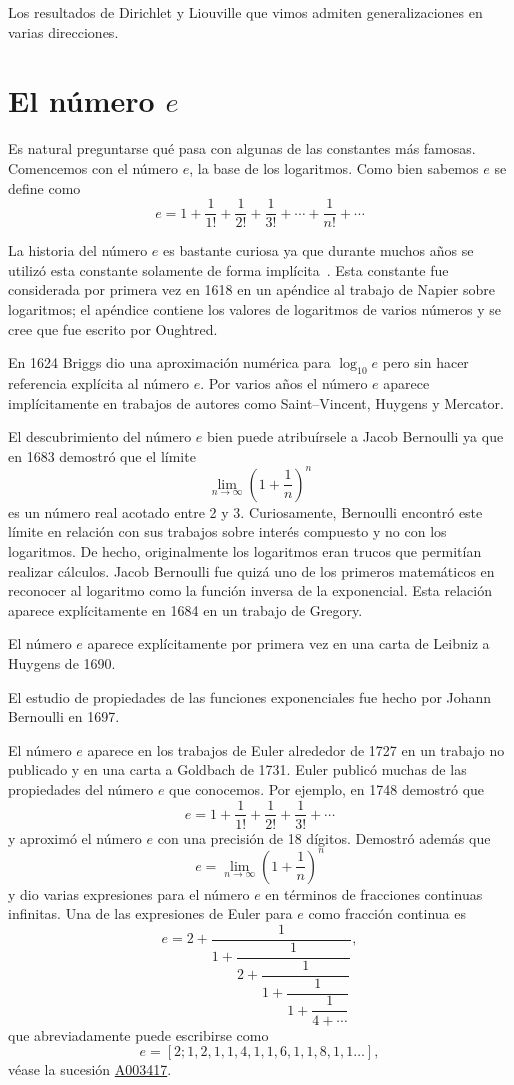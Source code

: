 Los resultados de Dirichlet y Liouville que vimos admiten generalizaciones en
varias direcciones. 


\section*{El número $e$}

Es natural preguntarse qué pasa con algunas de las constantes más famosas.
Comencemos con el número $e$, la base de los logaritmos.  Como bien sabemos $e$
se define como
\[
	e=1+\frac{1}{1!}+\frac{1}{2!}+\frac{1}{3!}+\cdots+\frac{1}{n!}+\cdots
\]

La historia del número $e$ es bastante curiosa ya que durante muchos años se
utilizó esta constante solamente de forma implícita~\cite{MR38289}. Esta constante fue
considerada por primera vez en 1618 en un apéndice al trabajo de Napier 
sobre logaritmos; el apéndice contiene los valores de logaritmos de varios
números y se cree que fue escrito por Oughtred. 

En 1624 Briggs dio una
aproximación numérica para $\log_{10}e$ pero sin hacer referencia explícita al
número $e$. Por varios años el número $e$ aparece implícitamente en trabajos de
autores como Saint--Vincent, Huygens y Mercator.  

El descubrimiento del número
$e$ bien puede atribuírsele a Jacob Bernoulli ya que en 1683 demostró que el
límite 
\[
	\lim_{n\to\infty}\left(1+\frac1n\right)^n
\]
es un número real acotado entre 2 y 3. Curiosamente, Bernoulli encontró este
límite en relación con sus trabajos sobre interés compuesto y no con los
logaritmos. De hecho, originalmente los logaritmos eran trucos que permitían
realizar cálculos. Jacob Bernoulli fue quizá uno de los primeros matemáticos en
reconocer al logaritmo como la función inversa de la exponencial. Esta relación
aparece explícitamente en 1684 en un trabajo de Gregory.

El número $e$ aparece explícitamente por primera vez en una carta de Leibniz a
Huygens de 1690. 

El estudio de propiedades de las funciones exponenciales fue
hecho por Johann Bernoulli en 1697. 

El número $e$ aparece en los trabajos de Euler 
alrededor de 1727 en un trabajo no publicado y 
en una carta a Goldbach de 1731. Euler publicó muchas de las propiedades del
número $e$ que conocemos. Por ejemplo, en 1748 demostró que 
\[
	e=1+\frac{1}{1!}+\frac{1}{2!}+\frac{1}{3!}+\cdots
\]
y aproximó el número $e$ con una precisión de 18 dígitos. Demostró además que 
\[
	e=\lim_{n\to\infty}\left(1+\frac1n\right)^n
\]
y dio varias expresiones para el número $e$ en términos de fracciones continuas
infinitas. Una de las expresiones de Euler para $e$ como fracción continua es 
\[
	e=2+\dfrac{1}{1+\dfrac{1}{2+\dfrac{1}{1+\dfrac{1}{1+\dfrac{1}{4+\cdots}}}}},
\]
que abreviadamente puede escribirse como
\[
	e = [2;1,2,1,1,4,1,1,6,1,1,8,1,1\dots],
\]
véase la sucesión \href{https://oeis.org/A003417}{A003417}.

